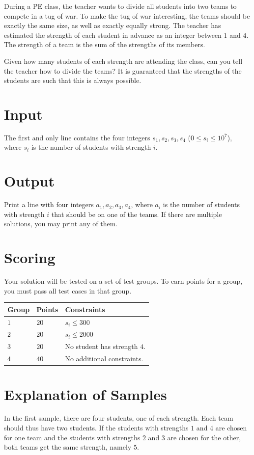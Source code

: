 During a PE class, the teacher wants to divide all students into two teams to compete in a tug of war.
To make the tug of war interesting, the teams should be exactly the same size, as well as exactly equally strong.
The teacher has estimated the strength of each student in advance as an integer between $1$ and $4$.
The strength of a team is the sum of the strengths of its members.

Given how many students of each strength are attending the class, can you tell the teacher how to divide the teams?
It is guaranteed that the strengths of the students are such that this is always possible.

\section*{Input}
The first and only line contains the four integers $s_1, s_2, s_3, s_4$ ($0 \le s_i \le 10^{7}$), where $s_i$ is the number of students with strength $i$.

\section*{Output}
Print a line with four integers $a_1, a_2, a_3, a_4$, where $a_i$ is the number of students with strength $i$ that should be on one of the teams.
If there are multiple solutions, you may print any of them.

\section*{Scoring}
Your solution will be tested on a set of test groups.
To earn points for a group, you must pass all test cases in that group.

\noindent
\begin{tabular}{| l | l | p{12cm} |}
  \hline
  \textbf{Group} & \textbf{Points} & \textbf{Constraints} \\ \hline
  $1$    & $20$      & $s_i \le 300$ \\ \hline
  $2$    & $20$      & $s_i \le 2000$ \\ \hline
  $3$    & $20$      & No student has strength $4$. \\ \hline
  $4$    & $40$      & No additional constraints. \\ \hline
\end{tabular}

\section*{Explanation of Samples}
In the first sample, there are four students, one of each strength.
Each team should thus have two students.
If the students with strengths $1$ and $4$ are chosen for one team and the students with strengths $2$ and $3$ are chosen for the other, both teams get the same strength, namely $5$.
